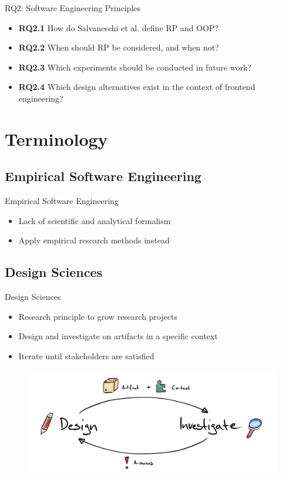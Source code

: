 \documentclass{beamer}
\begin{document}
\begin{frame}{RQ2: Software Engineering Principles}
	\begin{itemize}
		\item \textbf{RQ2.1} How do Salvaneschi et al. \cite{7827078} define RP and OOP?\bigskip
		\item \textbf{RQ2.2} When should RP be considered, and when not?\bigskip
		\item \textbf{RQ2.3} Which experiments should be conducted in future work?\bigskip
		\item \textbf{RQ2.4} Which design alternatives exist in the context of frontend engineering?
	\end{itemize}
\end{frame}


\section{Terminology}
\subsection*{Empirical Software Engineering}
\begin{frame}{Empirical Software Engineering}
	\begin{itemize}
		\item Lack of scientific and analytical formalism\bigskip
		\item Apply empirical research methods instead
	\end{itemize}
\end{frame}

\subsection*{Design Sciences}
\begin{frame}{Design Sciences}
	\begin{itemize}
		\item Research principle to grow research projects\bigskip
		\item Design and investigate on artifacts in a specific context\bigskip
		\item Iterate until stakeholders are satisfied
	\end{itemize}

	\begin{figure}
		\includegraphics[width=.8\textwidth]{assets/slides/design-sciences-process.png}
	\end{figure}
\end{frame}
\end{document}
